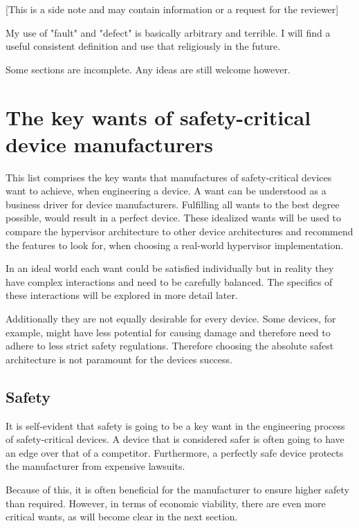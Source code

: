 [This is a side note and may contain information or a request for the reviewer]

My use of "fault" and "defect" is basically arbitrary and terrible. I will find a useful consistent definition and use that religiously in the future.

Some sections are incomplete. Any ideas are still welcome however.

\section{The key wants of safety-critical device manufacturers}
This list comprises the key wants that manufactures of safety-critical devices want to achieve, when engineering a device. A want can be understood as a business driver for device manufacturers. Fulfilling all wants to the best degree possible, would result in a perfect device. These idealized wants will be used to compare the hypervisor architecture to other device architectures and recommend the features to look for, when choosing a real-world hypervisor implementation.

In an ideal world each want could be satisfied individually but in reality they have complex interactions and need to be carefully balanced. The specifics of these interactions will be explored in more detail later.

Additionally they are not equally desirable for every device. Some devices, for example, might have less potential for causing damage and therefore need to adhere to less strict safety regulations. Therefore choosing the absolute safest architecture is not paramount for the devices success.

\subsection{Safety}
It is self-evident that safety is going to be a key want in the engineering process of safety-critical devices. A device that is considered safer is often going to have an edge over that of a competitor. Furthermore, a perfectly safe device protects the manufacturer from expensive lawsuits.

Because of this, it is often beneficial for the manufacturer to ensure higher safety than required. However, in terms of economic viability, there are even more critical wants, as will become clear in the next section.

